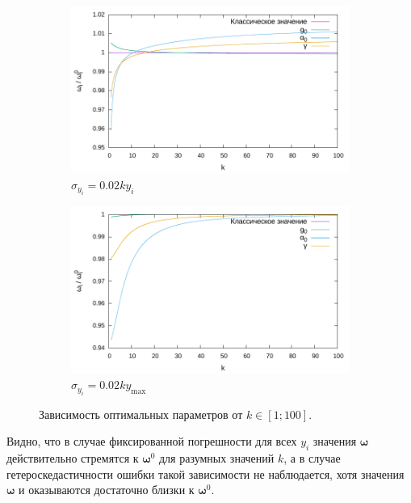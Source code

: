 \documentclass[tikz,11pt,a4paper]{article}
\begin{document}
\begin{figure}[h]
  \centering
  \begin{subfigure}[b]{0.5\textwidth}
    \includegraphics[width=\textwidth]{figs/levmar/convergence/varY/convergence_100.txt.pdf}
	\caption{$\sigma_{y_i} = 0.02ky_i$}
	\label{fig:conv_varY_100}
  \end{subfigure}%
  \begin{subfigure}[b]{0.5\textwidth}
    \includegraphics[width=\textwidth]{figs/levmar/convergence/fixedXY_0.1/convergence_100.txt.pdf}
	\caption{$\sigma_{y_i} = 0.02ky_{\max}$}
	\label{fig:conv_fixedY_100}
  \end{subfigure}
  \caption{Зависимость оптимальных параметров от $k \in [1; 100]$.}
  \label{fig:conv_varY}
\end{figure}

Видно, что в случае фиксированной погрешности для всех $y_i$ значения $\boldsymbol{\omega}$
действительно стремятся к $\boldsymbol{\omega}^0$ для разумных значений $k$, а в случае
гетероскедастичности ошибки такой зависимости не наблюдается, хотя значения $\boldsymbol{\omega}$
и оказываются достаточно близки к $\boldsymbol{\omega}^0$.
\end{document}
